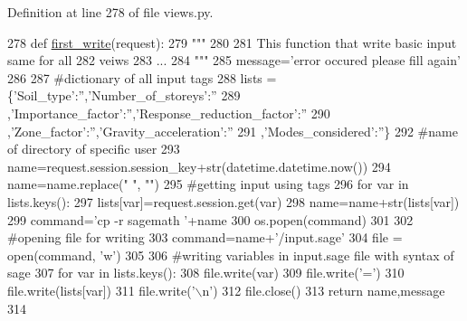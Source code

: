 Definition at line 278 of file views.\+py.


\begin{DoxyCode}
278 \textcolor{keyword}{def }\hyperlink{a00036_ad9397359f36a9df37e0aa43f3be032a3}{first\_write}(request):
279     \textcolor{stringliteral}{"""}
280 \textcolor{stringliteral}{}
281 \textcolor{stringliteral}{    This function that write basic input same for all}
282 \textcolor{stringliteral}{    veiws}
283 \textcolor{stringliteral}{    ...}
284 \textcolor{stringliteral}{    """}
285     message=\textcolor{stringliteral}{'error occured please fill again'}
286 
287     \textcolor{comment}{#dictionary of all input tags}
288     lists = \{\textcolor{stringliteral}{'Soil\_type'}:\textcolor{stringliteral}{''},\textcolor{stringliteral}{'Number\_of\_storeys'}:\textcolor{stringliteral}{''}
289     ,\textcolor{stringliteral}{'Importance\_factor'}:\textcolor{stringliteral}{''},\textcolor{stringliteral}{'Response\_reduction\_factor'}:\textcolor{stringliteral}{''}
290     ,\textcolor{stringliteral}{'Zone\_factor'}:\textcolor{stringliteral}{''},\textcolor{stringliteral}{'Gravity\_acceleration'}:\textcolor{stringliteral}{''}
291     ,\textcolor{stringliteral}{'Modes\_considered'}:\textcolor{stringliteral}{''}\}
292     \textcolor{comment}{#name of directory of specific user}
293     name=request.session.session\_key+str(datetime.datetime.now())
294     name=name.replace(\textcolor{stringliteral}{" "}, \textcolor{stringliteral}{""})
295     \textcolor{comment}{#getting input using tags}
296     \textcolor{keywordflow}{for} var \textcolor{keywordflow}{in} lists.keys():
297         lists[var]=request.session.get(var)
298         name=name+str(lists[var])
299     command=\textcolor{stringliteral}{'cp -r sagemath '}+name
300     os.popen(command)
301 
302     \textcolor{comment}{#opening file for writing}
303     command=name+\textcolor{stringliteral}{'/input.sage'}
304     file = open(command, \textcolor{stringliteral}{'w'})
305 
306     \textcolor{comment}{#writing variables in input.sage file with syntax of sage}
307     \textcolor{keywordflow}{for} var \textcolor{keywordflow}{in} lists.keys():
308         file.write(var)
309         file.write(\textcolor{stringliteral}{'='})
310         file.write(lists[var])
311         file.write(\textcolor{stringliteral}{'\(\backslash\)n'})
312     file.close()
313     \textcolor{keywordflow}{return} name,message
314 \end{DoxyCode}


